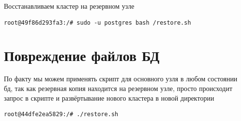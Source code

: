 \documentclass{article}
\begin{document}
Восстанавливаем кластер на резервном узле
\begin{lstlisting}[caption={kitty}, label={lst:example}]
    root@49f86d293fa3:/# sudo -u postgres bash /restore.sh 
\end{lstlisting}

\section*{Повреждение файлов БД}
По факту мы можем применять скрипт для основного узля в любом состоянии бд, так как резервная копия находится на резервном узле, просто происходит запрос в скрипте и развёртывание нового кластера в новой директории

\begin{lstlisting}[caption={kitty}, label={lst:example}]
    root@44dfe2ea5829:/# ./restore.sh 
\end{lstlisting}
\end{document}
